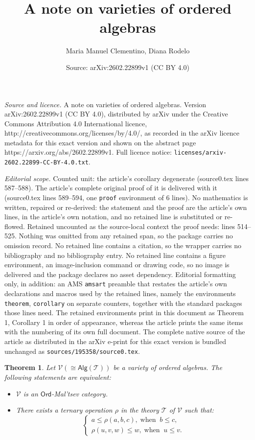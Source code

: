 \documentclass[10pt,a4paper]{amsart}
\title{A note on varieties of ordered algebras}
\author{Maria Manuel Clementino, Diana Rodelo}
\date{Source: arXiv:2602.22899v1 (CC BY 4.0)}
\newtheorem{theorem}{Theorem}
\newcommand{\Alg}[1]{\ensuremath{\mathsf{Alg}(#1)}}
\newcommand{\Ord}{\ensuremath{\mathsf{Ord}}}
\newcommand{\T}{\ensuremath{\mathcal{T}}}
\newcommand{\V}{\ensuremath{\mathcal{V}}}
\begin{document}
\maketitle

\noindent\emph{Source and licence.} A note on varieties of ordered algebras. Version arXiv:2602.22899v1 (CC BY 4.0), distributed by arXiv under the Creative Commons Attribution 4.0 International licence, http://creativecommons.org/licenses/by/4.0/, as recorded in the arXiv licence metadata for this exact version and shown on the abstract page https://arxiv.org/abs/2602.22899v1. Full licence notice: \texttt{licenses/arxiv-2602.22899-CC-BY-4.0.txt}.\par\smallskip

\noindent\textit{Editorial scope.} Counted unit: the article's corollary degenerate (source0.tex lines 587--588). The article's complete original proof of it is delivered with it (source0.tex lines 589--594, one \texttt{proof} environment of 6 lines). No mathematics is written, repaired or re-derived: the statement and the proof are the article's own lines, in the article's own notation, and no retained line is substituted or re-flowed.  Retained uncounted as the source-local context the proof needs: lines 514--525.  Nothing was omitted from any retained span, so the package carries no omission record.  No retained line contains a citation, so the wrapper carries no bibliography and no bibliography entry.  No retained line contains a figure environment, an image-inclusion command or drawing code, so no image is delivered and the package declares no asset dependency.  Editorial formatting only, in addition: an AMS \texttt{amsart} preamble that restates the article's own declarations and macros used by the retained lines, namely the environments \texttt{theorem}, \texttt{corollary} on separate counters, together with the standard packages those lines need.  The retained environments print in this document as Theorem 1, Corollary 1 in order of appearance, whereas the article prints the same items with the numbering of its own full document.  The complete native source of the article as distributed in the arXiv e-print for this exact version is bundled unchanged as \texttt{sources/195358/source0.tex}.
\begin{theorem}\label{Ord-Maltsev ord-varieties} Let $\V(\cong \Alg{\T})$ be a variety of ordered algebras. The following statements are equivalent:
\begin{itemize}
	\item[(i)] $\V$ is an $\Ord$-Mal'tsev category.
	\item[(ii)] There exists a ternary operation $\rho$ in the theory $\T$ of $\V$ such that:
	\[
	\left\{\begin{array}{l}
		a\le \rho(a,b,c), \;\text{when}\;\; b\le c, \\
		\rho(u,v,w)\le w, \;\text{when}\;\; u\le v.
		\end{array}\right.
	\]
\end{itemize}
\end{theorem}
\end{document}
